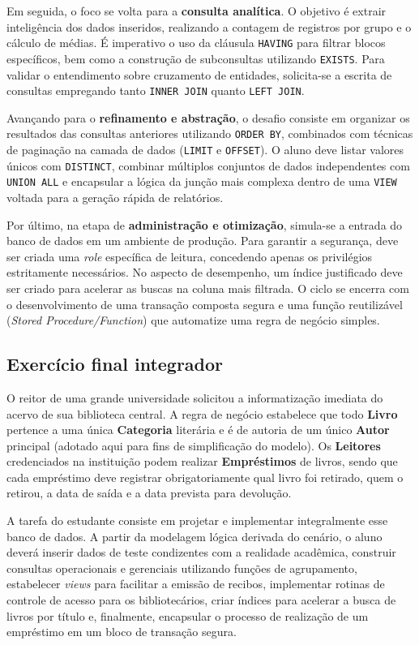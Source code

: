 Em seguida, o foco se volta para a \textbf{consulta analítica}. O objetivo é extrair inteligência dos dados inseridos, realizando a contagem de registros por grupo e o cálculo de médias. É imperativo o uso da cláusula \texttt{HAVING} para filtrar blocos específicos, bem como a construção de subconsultas utilizando \texttt{EXISTS}. Para validar o entendimento sobre cruzamento de entidades, solicita-se a escrita de consultas empregando tanto \texttt{INNER JOIN} quanto \texttt{LEFT JOIN}.

Avançando para o \textbf{refinamento e abstração}, o desafio consiste em organizar os resultados das consultas anteriores utilizando \texttt{ORDER BY}, combinados com técnicas de paginação na camada de dados (\texttt{LIMIT} e \texttt{OFFSET}). O aluno deve listar valores únicos com \texttt{DISTINCT}, combinar múltiplos conjuntos de dados independentes com \texttt{UNION ALL} e encapsular a lógica da junção mais complexa dentro de uma \texttt{VIEW} voltada para a geração rápida de relatórios.

Por último, na etapa de \textbf{administração e otimização}, simula-se a entrada do banco de dados em um ambiente de produção. Para garantir a segurança, deve ser criada uma \textit{role} específica de leitura, concedendo apenas os privilégios estritamente necessários. No aspecto de desempenho, um índice justificado deve ser criado para acelerar as buscas na coluna mais filtrada. O ciclo se encerra com o desenvolvimento de uma transação composta segura e uma função reutilizável (\textit{Stored Procedure/Function}) que automatize uma regra de negócio simples.

\subsection{Exercício final integrador}

O reitor de uma grande universidade solicitou a informatização imediata do acervo de sua biblioteca central. A regra de negócio estabelece que todo \textbf{Livro} pertence a uma única \textbf{Categoria} literária e é de autoria de um único \textbf{Autor} principal (adotado aqui para fins de simplificação do modelo). Os \textbf{Leitores} credenciados na instituição podem realizar \textbf{Empréstimos} de livros, sendo que cada empréstimo deve registrar obrigatoriamente qual livro foi retirado, quem o retirou, a data de saída e a data prevista para devolução.

A tarefa do estudante consiste em projetar e implementar integralmente esse banco de dados. A partir da modelagem lógica derivada do cenário, o aluno deverá inserir dados de teste condizentes com a realidade acadêmica, construir consultas operacionais e gerenciais utilizando funções de agrupamento, estabelecer \textit{views} para facilitar a emissão de recibos, implementar rotinas de controle de acesso para os bibliotecários, criar índices para acelerar a busca de livros por título e, finalmente, encapsular o processo de realização de um empréstimo em um bloco de transação segura.

